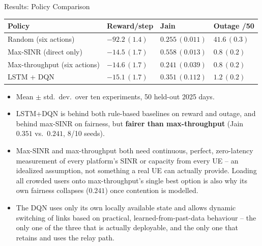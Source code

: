 \documentclass[aspectratio=169]{beamer}
\begin{document}
\begin{frame}{Results: Policy Comparison}
\footnotesize
\begin{table}
\centering
\begin{tabularx}{\linewidth}{|>{\raggedright\arraybackslash}X|>{\centering\arraybackslash}X|>{\centering\arraybackslash}X|>{\centering\arraybackslash}X|}
\hline
\textbf{Policy} & \textbf{Reward/step} & \textbf{Jain} & \textbf{Outage /50} \\
\hline
Random (six actions) & $-92.2\,(1.4)$ & $0.255\,(0.011)$ & $41.6\,(0.3)$ \\
\hline
Max-SINR (direct only) & $-14.5\,(1.7)$ & $\mathbf{0.558}\,(0.013)$ & $\mathbf{0.8}\,(0.2)$ \\
\hline
Max-throughput (six actions) & $\mathbf{-14.6}\,(1.7)$ & $0.241\,(0.039)$ & $\mathbf{0.8}\,(0.2)$ \\
\hline
LSTM + DQN & $-15.1\,(1.7)$ & $0.351\,(0.112)$ & $1.2\,(0.2)$ \\
\hline
\end{tabularx}
\end{table}
\begin{itemize}
  \item Mean $\pm$ std.\ dev.\ over ten experiments, 50 held-out 2025 days.
  \item LSTM+DQN is behind both rule-based baselines on reward and
        outage, and behind max-SINR on fairness, but \textbf{fairer
        than max-throughput} (Jain $0.351$ vs.\ $0.241$, 8/10 seeds).
  \item Max-SINR and max-throughput both need continuous, perfect,
        zero-latency measurement of every platform's SINR or capacity
        from every UE -- an idealized assumption, not something a
        real UE can actually provide. Loading all crowded users onto
        max-throughput's single best option is also why its own
        fairness collapses ($0.241$) once contention is modelled.
  \item The DQN uses only its own locally available state and allows
        dynamic switching of links based on practical,
        learned-from-past-data behaviour -- the only one of the three
        that is actually deployable, and the only one that retains
        and uses the relay path.
\end{itemize}
\end{frame}
\end{document}
